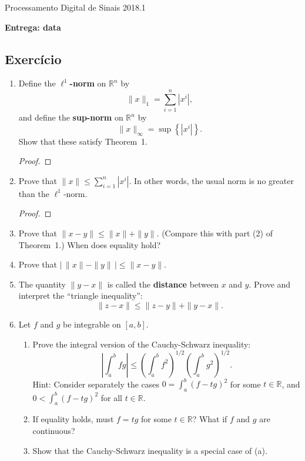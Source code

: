 \documentclass[]{book}
\theoremstyle{definition}
\newcommand{\bb}[1]{\mathbb{#1}}
\newcommand{\R}{\bb{R}}
\newcommand{\textdf}[1]{\textbf{\textsf{#1}}\index{#1}}
\newcommand{\ds}{\displaystyle}
\begin{document}
\begin{center}
{\Large Processamento Digital de Sinais \hspace{0.5cm} 2018.1}\\
\end{center}

\textbf{\Large Entrega: data} %

\vspace{0.2 cm}


\subsection*{Exercício}

\begin{enumerate}
\item\label{norms}
Define the \textdf{$\ell^1$-norm} on $\R^n$ by
	$$\|x\|_1 = \sum_{i=1}^n |x^i|,$$
	and define the \textdf{sup-norm} on $\R^n$ by
	$$\|x\|_\infty = \sup\left\{|x^i|\right\}.$$
	Show that these satisfy Theorem~1.
\begin{proof}
\end{proof}

\item	Prove that $\ds \|x\|\leq \sum_{i=1}^n |x^i|$.  In other words, the usual norm is no greater than the $\ell^1$-norm.
\begin{proof}
\end{proof}

\item	Prove that $\|x-y\| \leq \|x\| + \|y\|$.  (Compare this with part (2) of
	Theorem~1.)  When does equality hold?

\item	Prove that $\ds \bigg| \, \|x\|-\|y\| \, \bigg| \leq \|x-y\|$.

\item	The quantity $\|y-x\|$ is called the \textdf{distance} between $x$ and
$y$.  Prove and interpret the ``triangle inequality'':
$$\|z-x\| \leq \|z-y\| + \|y-x\|.$$

\item\label{caushw}	Let $f$ and $g$ be integrable on $[a,b]$.
\begin{enumerate}
	\item	Prove the integral version of the Cauchy-Schwarz inequality:
	$$\left|\int_a^b fg\right| \leq \left(\int_a^b
	f^2\right)^{1/2}\left(\int_a^b g^2\right)^{1/2}.$$
	Hint:  Consider separately the cases $0 = \int_a^b(f-t g)^2$ for
	some $t\in\R$, and $0<\int_a^b(f-t g)^2$ for all
	$t\in\R$.
	\item	If equality holds, must $f=t g$ for some $t\in\R$? 
	What if $f$ and $g$ are continuous?
	\item	Show that the Cauchy-Schwarz inequality is a special case of
	(a).


\end{enumerate}
\end{enumerate}
\end{document}
